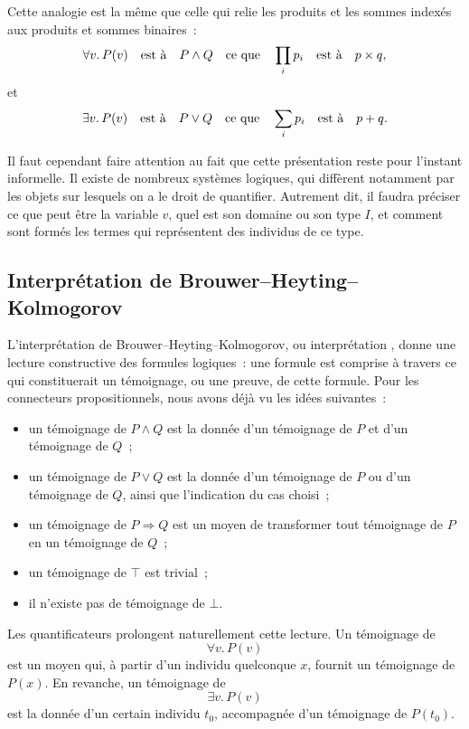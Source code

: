 Cette analogie est la même que celle qui relie les produits et les
sommes indexés aux produits et sommes binaires :
\[
\forall v.\,P(v)
\quad\hbox{est à}\quad
P\land Q
\quad\hbox{ce que}\quad
\prod_i p_i
\quad\hbox{est à}\quad
p\times q,
\]
et
\[
\exists v.\,P(v)
\quad\hbox{est à}\quad
P\lor Q
\quad\hbox{ce que}\quad
\sum_i p_i
\quad\hbox{est à}\quad
p+q.
\]

\thingy
Il faut cependant faire attention au fait que cette présentation reste
pour l'instant informelle.  Il existe de nombreux systèmes logiques,
qui diffèrent notamment par les objets sur lesquels on a le droit de
quantifier.  Autrement dit, il faudra préciser ce que peut être la
variable $v$, quel est son domaine ou son type $I$, et comment sont
formés les termes qui représentent des individus de ce type.

\subsection{Interprétation de Brouwer--Heyting--Kolmogorov}

\thingy
L'interprétation de Brouwer--Heyting--Kolmogorov, ou interprétation
, donne une lecture constructive des formules logiques : une
formule est comprise à travers ce qui constituerait un témoignage, ou
une preuve, de cette formule.  Pour les connecteurs propositionnels,
nous avons déjà vu les idées suivantes :
\begin{itemize}
\item un témoignage de $P\land Q$ est la donnée d'un témoignage de $P$
  et d'un témoignage de $Q$ ;
\item un témoignage de $P\lor Q$ est la donnée d'un témoignage de $P$
  ou d'un témoignage de $Q$, ainsi que l'indication du cas choisi ;
\item un témoignage de $P\Rightarrow Q$ est un moyen de transformer
  tout témoignage de $P$ en un témoignage de $Q$ ;
\item un témoignage de $\top$ est trivial ;
\item il n'existe pas de témoignage de $\bot$.
\end{itemize}

\thingy
Les quantificateurs prolongent naturellement cette lecture.  Un
témoignage de
\[
\forall v.\,P(v)
\]
est un moyen qui, à partir d'un individu quelconque $x$, fournit un
témoignage de $P(x)$.  En revanche, un témoignage de
\[
\exists v.\,P(v)
\]
est la donnée d'un certain individu $t_0$, accompagnée d'un témoignage
de $P(t_0)$.

